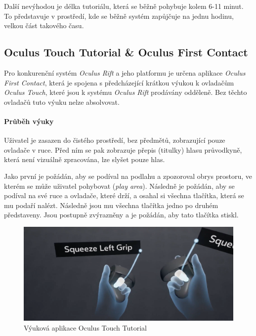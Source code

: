 Další nevýhodou je délka tutoriálu, která se běžně pohybuje kolem 6-11
minut. To představuje v prostředí, kde se běžně systém zapůjčuje na
jednu hodinu, velkou část takového času.

\subsection{Oculus Touch Tutorial \& Oculus First
Contact}\label{oculus-touch-tutorial-oculus-first-contact}

Pro konkurenční systém \emph{Oculus Rift} a jeho platformu je určena
aplikace \emph{Oculus First Contact}, která je spojena s předcházející
krátkou výukou k ovladačům \emph{Oculus Touch}, které jsou k systému
\emph{Oculus Rift} prodávány odděleně. Bez těchto ovladačů tuto výuku
nelze absolvovat.

\paragraph{Průběh výuky}\label{prux16fbux11bh-vuxfduky-1}

Uživatel je zasazen do čistého prostředí, bez předmětů, zobrazující
pouze ovladače v ruce. Před ním se pak zobrazuje přepis (titulky) hlasu
průvodkyně, která není vizuálně zpracována, lze slyšet pouze hlas.

Jako první je požádán, aby se podíval na podlahu a zpozoroval obrys
prostoru, ve kterém se může uživatel pohybovat (\emph{play area}).
Následně je požádán, aby se podíval na své ruce a ovladače, které drží,
a osahal si všechna tlačítka, která se mu podaří nalézt. Následně jsou
mu všechna tlačítka jedno po druhém představeny. Jsou postupně
zvýrazněny a je požádán, aby tato tlačítka stiskl.

\begin{figure}
\centering
\includegraphics[width=12cm]{src/assets/oculus-tutorial.png}
\caption{Výuková aplikace Oculus Touch Tutorial}
\end{figure}

